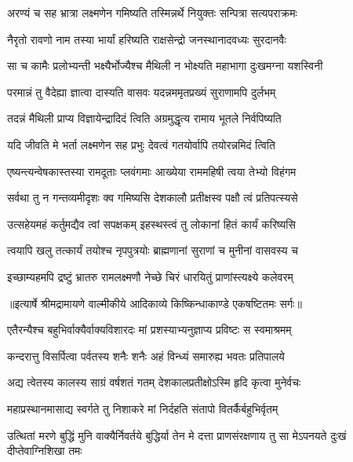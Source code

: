 \twolineshloka
{अरण्यं च सह भ्रात्रा लक्ष्मणेन गमिष्यति}
{तस्मिन्नर्थे नियुक्तः सन्पित्रा सत्यपराक्रमः} %

\twolineshloka
{नैरृतो रावणो नाम तस्या भार्यां हरिष्यति}
{राक्षसेन्द्रो जनस्थानादवध्यः सुरदानवैः} %

\twolineshloka
{सा च कामैः प्रलोभ्यन्ती भक्ष्यैर्भोज्यैश्च मैथिली}
{न भोक्ष्यति महाभागा दुःखमग्ना यशस्विनी} %

\twolineshloka
{परमान्नं तु वैदेह्या ज्ञात्वा दास्यति वासवः}
{यदन्नममृतप्रख्यं सुराणामपि दुर्लभम्} %

\twolineshloka
{तदन्नं मैथिली प्राप्य विज्ञायेन्द्रादिदं त्विति}
{अग्रमुद्धृत्य रामाय भूतले निर्वपिष्यति} %

\twolineshloka
{यदि जीवति मे भर्ता लक्ष्मणेन सह प्रभुः}
{देवत्वं गतयोर्वापि तयोरन्नमिदं त्विति} %

\twolineshloka
{एष्यन्त्यन्वेषकास्तस्या रामदूताः प्लवंगमाः}
{आख्येया राममहिषी त्वया तेभ्यो विहंगम} %

\twolineshloka
{सर्वथा तु न गन्तव्यमीदृशः क्व गमिष्यसि}
{देशकालौ प्रतीक्षस्व पक्षौ त्वं प्रतिपत्स्यसे} %

\twolineshloka
{उत्सहेयमहं कर्तुमद्यैव त्वां सपक्षकम्}
{इहस्थस्त्वं तु लोकानां हितं कार्यं करिष्यसि} %

\twolineshloka
{त्वयापि खलु तत्कार्यं तयोश्च नृपपुत्रयोः}
{ब्राह्मणानां सुराणां च मुनीनां वासवस्य च} %

\twolineshloka
{इच्छाम्यहमपि द्रष्टुं भ्रातरु रामलक्ष्मणौ}
{नेच्छे चिरं धारयितुं प्राणांस्त्यक्ष्ये कलेवरम्} %


{॥इत्यार्षे श्रीमद्रामायणे वाल्मीकीये आदिकाव्ये किष्किन्धाकाण्डे एकषष्टितमः सर्गः॥}


\twolineshloka
{एतैरन्यैश्च बहुभिर्वाक्यैर्वाक्यविशारदः}
{मां प्रशस्याभ्यनुज्ञाप्य प्रविष्टः स स्वमाश्रमम्} %

\twolineshloka
{कन्दरात्तु विसर्पित्वा पर्वतस्य शनैः शनैः}
{अहं विन्ध्यं समारुह्य भवतः प्रतिपालये} %

\twolineshloka
{अद्य त्वेतस्य कालस्य साग्रं वर्षशतं गतम्}
{देशकालप्रतीक्षोऽस्मि हृदि कृत्वा मुनेर्वचः} %

\twolineshloka
{महाप्रस्थानमासाद्य स्वर्गते तु निशाकरे}
{मां निर्दहति संतापो वितर्कैर्बहुभिर्वृतम्} %

\threelineshloka
{उत्थितां मरणे बुद्धिं मुनि वाक्यैर्निवर्तये}
{बुद्धिर्या तेन मे दत्ता प्राणसंरक्षणाय तु}
{सा मेऽपनयते दुःखं दीप्तेवाग्निशिखा तमः} %

